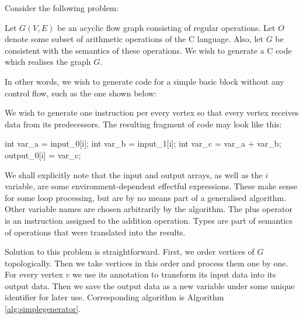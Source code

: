 \label{sec:simplegensec}

Consider the following problem:

Let $G(V,E)$ be an acyclic flow graph consisting of regular operations. Let $O$ denote some subset of arithmetic operations of the C language. Also, let $G$ be consistent with the semantics of these operations. We wish to generate a C code which realises the graph $G$.
\myendprob

In other words, we wish to generate code for a simple basic block without any control flow, such as the one shown below:


We wish to generate one instruction per every vertex so that every vertex receives data from its predecessors. The resulting fragment of code may look like this:

\mybeginfig
\begin{code}
int var_a = input_0[i];
int var_b = input_1[i];
int var_c = var_a + var_b;
output_0[i] = var_c;
\end{code}

\begin{rem}
  We shall explicitly note that the input and output arrays, as well as the $i$ variable, are some environment-dependent effectful expressions. These make sense for some loop processing, but are by no means part of a generalised algorithm. Other variable names are chosen arbitrarily by the algorithm. The plus operator is an instruction assigned to the addition operation. Types are part of semantics of operations that were translated into the results.
\end{rem}

Solution to this problem is straightforward. First, we order vertices of $G$ topologically. Then we take vertices in this order and process them one by one. For every vertex $v$ we use its annotation to transform its input data into its output data. Then we save the output data as a new variable under some unique identifier for later use. Corresponding algorithm is Algorithm \ref{alg:simplegenerator}.


